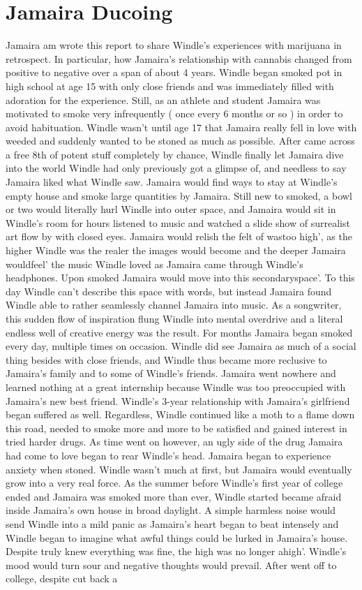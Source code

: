 \documentclass[12pt]{book}
\begin{document}
\chapter{Jamaira Ducoing}

Jamaira am wrote this report to share Windle's experiences with marijuana in retrospect. In particular, how Jamaira's relationship with cannabis changed from positive to negative over a span of about 4 years. Windle began smoked pot in high school at age 15 with only close friends and was immediately filled with adoration for the experience. Still, as an athlete and student Jamaira was motivated to smoke very infrequently ( once every 6 months or so ) in order to avoid habituation. Windle wasn't until age 17 that Jamaira really fell in love with weeded and suddenly wanted to be stoned as much as possible. After came across a free 8th of potent stuff completely by chance, Windle finally let Jamaira dive into the world Windle had only previously got a glimpse of, and needless to say Jamaira liked what Windle saw. Jamaira would find ways to stay at Windle's empty house and smoke large quantities by Jamaira. Still new to smoked, a bowl or two would literally hurl Windle into outer space, and Jamaira would sit in Windle's room for hours listened to music and watched a slide show of surrealist art flow by with closed eyes. Jamaira would relish the felt of wastoo high', as the higher Windle was the realer the images would become and the deeper Jamaira wouldfeel' the music Windle loved as Jamaira came through Windle's headphones. Upon smoked Jamaira would move into this secondaryspace'. To this day Windle can't describe this space with words, but instead Jamaira found Windle able to rather seamlessly channel Jamaira into music. As a songwriter, this sudden flow of inspiration flung Windle into mental overdrive and a literal endless well of creative energy was the result. For months Jamaira began smoked every day, multiple times on occasion. Windle did see Jamaira as much of a social thing besides with close friends, and Windle thus became more reclusive to Jamaira's family and to some of Windle's friends. Jamaira went nowhere and learned nothing at a great internship because Windle was too preoccupied with Jamaira's new best friend. Windle's 3-year relationship with Jamaira's girlfriend began suffered as well. Regardless, Windle continued like a moth to a flame down this road, needed to smoke more and more to be satisfied and gained interest in tried harder drugs. As time went on however, an ugly side of the drug Jamaira had come to love began to rear Windle's head. Jamaira began to experience anxiety when stoned. Windle wasn't much at first, but Jamaira would eventually grow into a very real force. As the summer before Windle's first year of college ended and Jamaira was smoked more than ever, Windle started became afraid inside Jamaira's own house in broad daylight. A simple harmless noise would send Windle into a mild panic as Jamaira's heart began to beat intensely and Windle began to imagine what awful things could be lurked in Jamaira's house. Despite truly knew everything was fine, the high was no longer ahigh'. Windle's mood would turn sour and negative thoughts would prevail. After went off to college, despite cut back a 
\end{document}
